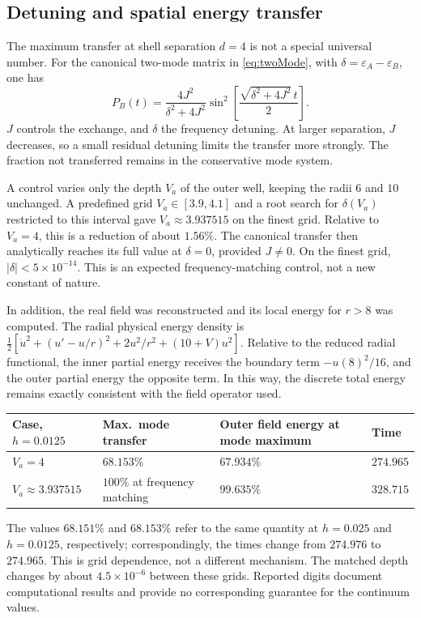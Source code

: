 \documentclass[a4paper,11pt]{article}
\newenvironment{drafttable}{\begin{center}\small\renewcommand{\arraystretch}{1.2}}{\end{center}}
\begin{document}
\subsection{Detuning and spatial energy transfer}\label{sec:detuning}
The maximum transfer at shell separation $d=4$ is not a special universal number. For the canonical two-mode matrix in \eqref{eq:twoMode}, with $\delta=\varepsilon_A-\varepsilon_B$, one has
\begin{equation}\label{eq:transfer}
P_B(t)=\frac{4J^2}{\delta^2+4J^2}
\sin^2\left[\frac{\sqrt{\delta^2+4J^2}\,t}{2}\right].
\end{equation}
$J$ controls the exchange, and $\delta$ the frequency detuning. At larger separation, $J$ decreases, so a small residual detuning limits the transfer more strongly. The fraction not transferred remains in the conservative mode system.

A control varies only the depth $V_a$ of the outer well, keeping the radii $6$ and $10$ unchanged. A predefined grid $V_a\in[3.9,4.1]$ and a root search for $\delta(V_a)$ restricted to this interval gave $V_a\approx3.937515$ on the finest grid. Relative to $V_a=4$, this is a reduction of about $1.56\%$. The canonical transfer then analytically reaches its full value at $\delta=0$, provided $J\ne0$. On the finest grid, $|\delta|<5\times10^{-14}$. This is an expected frequency-matching control, not a new constant of nature.

In addition, the real field was reconstructed and its local energy for $r>8$ was computed. The radial physical energy density is $\tfrac12[\dot u^2+(u'-u/r)^2+2u^2/r^2+(10+V)u^2]$. Relative to the reduced radial functional, the inner partial energy receives the boundary term $-u(8)^2/16$, and the outer partial energy the opposite term. In this way, the discrete total energy remains exactly consistent with the field operator used.

\begin{drafttable}
\begin{tabularx}{\linewidth}{@{}lXXl@{}}\toprule
Case, $h=0.0125$ & Max.\ mode transfer & Outer field energy at mode maximum & Time\\\midrule
$V_a=4$ & $68.153\%$ & $67.934\%$ & $274.965$\\
$V_a\approx3.937515$ & $100\%$ at frequency matching & $99.635\%$ & $328.715$\\\bottomrule
\end{tabularx}
\end{drafttable}
{\small The values $68.151\%$ and $68.153\%$ refer to the same quantity at $h=0.025$ and $h=0.0125$, respectively; correspondingly, the times change from $274.976$ to $274.965$. This is grid dependence, not a different mechanism. The matched depth changes by about $4.5\times10^{-6}$ between these grids. Reported digits document computational results and provide no corresponding guarantee for the continuum values.\par}
\end{document}
